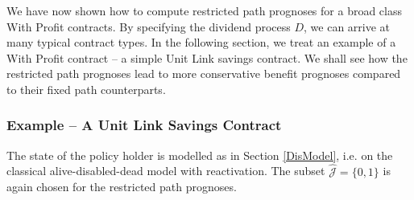 \documentclass{article}
\newcommand{\1}[1]{\mathbbm{1}_{\left\lbrace #1 \right\rbrace}}
\theoremstyle{break}
\theoremstyle{remark}
\numberwithin{equation}{section}
\begin{document}
We have now shown how to compute restricted path prognoses for a broad class With Profit contracts. By specifying the dividend process $D$, we can arrive at many typical contract types. In the following section, we treat an example of a With Profit contract -- a simple Unit Link savings contract. We shall see how the restricted path prognoses lead to more conservative benefit prognoses compared to their fixed path counterparts.

\newpage
\subsubsection{Example -- A Unit Link Savings Contract} \label{Numerics}

The state of the policy holder is modelled as in Section \ref{DisModel}, i.e. on the classical alive-disabled-dead model with reactivation. The subset $\hat{\mathcal{J}} = \{ 0,1 \}$ is again chosen for the restricted path prognoses.
\end{document}
